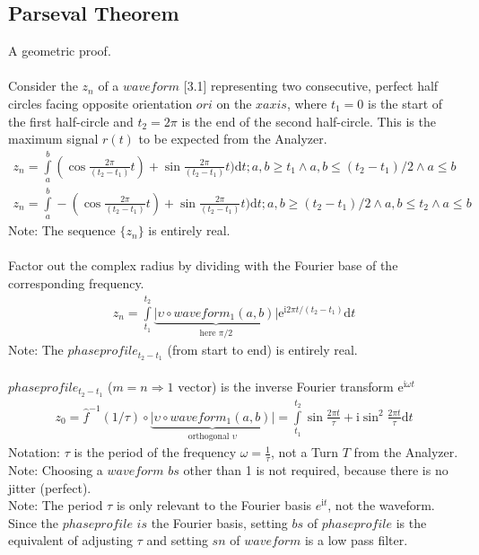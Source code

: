 \documentclass{report}
\begin{document}
\subsection{Parseval Theorem}
A geometric proof.\\\\
Consider the $z_{n}$ of a $waveform$ \cite{Grapher}[3.1] representing two consecutive, perfect half circles facing opposite orientation $ori$ on the $xaxis$, where $t_{1}=0$ is the start of the first half-circle and $t_{2}=2\pi$ is the end of the second half-circle. This is the maximum signal $r(t)$ to be expected from the Analyzer.
\begin{align}
z_{n} = \int \limits _{a}^{b}(\cos \frac{2\pi}{(t_{2}-t_{1})}t)+ \sin \frac{2\pi}{(t_{2}-t_{1})}t) \mathrm{d}t;a,b\geq t_{1} \land a,b\leq (t_{2}-t_{1})/2 \land a\leq b\label{eq:5}\\
z_{n} = \int \limits _{a}^{b}-(\cos \frac{2\pi}{(t_{2}-t_{1})}t)+ \sin \frac{2\pi}{(t_{2}-t_{1})}t) \mathrm{d}t;a,b\geq (t_{2}-t_{1})/2 \land a,b\leq t_{2} \land a\leq b
\end{align}
Note: The sequence $\{z_{n}\}$ is entirely real.\\\\
Factor out the complex radius by dividing with the Fourier base of the corresponding frequency.
\begin{align}
z_{n} = \int \limits _{t_{1}}^{t_{2}} \underbrace{\lvert \upsilon \circ waveform_{1}(a,b)\rvert}_{\text{here }\pi /2} \mathrm{e}^{\mathrm{i}2\pi t/(t_{2}-t_{1})}\mathrm{d}t\label{eq:4}
\end{align}
Note: The $phaseprofile_{t_{2}-t_{1}}$ (from start to end) is entirely real.\\\\
$phaseprofile_{t_{2}-t_{1}}$ ($m=n\Rightarrow \text{1 vector}$) is the inverse Fourier transform $\mathrm{e}^{\mathrm{i}\omega t}$
\begin{align}
z_{0} = \hat{f}^{-1}(1/\tau)\circ \underbrace{\lvert \upsilon \circ waveform_{1}(a,b)\rvert}_{\text{orthogonal }\upsilon} = \int \limits _{t_{1}}^{t_{2}} \sin \frac{2\pi t}{\tau} + \mathrm{i} \sin^2 \frac{2\pi t}{\tau} \mathrm{d}t
\end{align}
Notation: $\tau$ is the period of the frequency $\omega=\frac{1}{\tau}$, not a Turn $T$ from the Analyzer.\\
Note: Choosing a $waveform$ $bs$ other than 1 is not required, because there is no jitter (perfect).\\
Note: The period $\tau$ is only relevant to the Fourier basis $e^{\mathrm{i}t}$, not the waveform. Since the $phaseprofile$ $is$ the Fourier basis, setting $bs$ of $phaseprofile$ is the equivalent of adjusting $\tau$ and setting $sn$ of $waveform$ is a low pass filter.\\\\
\end{document}
